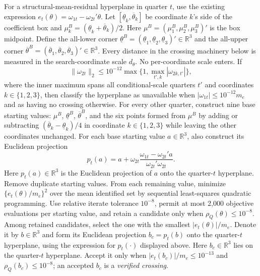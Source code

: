 \documentclass[11pt]{article}
\begin{document}
For a structural-mean-residual hyperplane in quarter \(t\), use the existing expression
\(e_t(\theta)=\omega_{1t}-\omega_{2t}'\theta\). Let \([\underline\theta_k,\overline\theta_k]\) be coordinate
\(k\)'s side of the coefficient box and \(\mu_k^B=(\underline\theta_k+\overline\theta_k)/2\). Here
\(\mu^B=(\mu_1^B,\mu_2^B,\mu_3^B)'\) is the box midpoint. Define the all-lower corner
\(\underline\theta^B=(\underline\theta_1,\underline\theta_2,\underline\theta_3)'\in\mathbb R^3\) and
the all-upper corner
\(\overline\theta^B=(\overline\theta_1,\overline\theta_2,\overline\theta_3)'\in\mathbb R^3\). Every distance in the crossing machinery below is measured in the search-coordinate scale \(d_\theta\). No per-coordinate scale enters.
If
\begin{equation*}
 \|\omega_{2t}\|_2\le10^{-12}\max\{1,\max_{t',k}|\omega_{2k,t'}|\},
\end{equation*}
where the inner maximum spans all conditional-scale quarters \(t'\) and coordinates
\(k\in\{1,2,3\}\),
then classify the hyperplane as unavailable when \(|\omega_{1t}|\le10^{-12}m_e\) and as having no crossing
otherwise. For every other quarter, construct nine base starting values: \(\mu^B\),
\(\underline\theta^B\), \(\overline\theta^B\),
and the six points formed from \(\mu^B\) by adding or subtracting \((\overline\theta_k-\underline\theta_k)/4\) in coordinate
\(k\in\{1,2,3\}\) while leaving the other coordinates unchanged. For each base starting value
\(a\in\mathbb R^3\), also construct its Euclidean projection
\begin{equation*}
 p_t(a)=a+\omega_{2t}\frac{\omega_{1t}-\omega_{2t}'a}{\omega_{2t}'\omega_{2t}}.
\end{equation*}
Here \(p_t(a)\in\mathbb R^3\) is the Euclidean projection of \(a\) onto the quarter-\(t\)
hyperplane.
Remove duplicate starting values. From each remaining value, minimize
\(\{e_t(\theta)/m_e\}^2\) over the mean identified set by sequential least-squares quadratic
programming. Use relative iterate tolerance \(10^{-8}\), permit at most 2,000 objective evaluations
per starting value, and retain a candidate only when \(\rho_Q(\theta)\le10^{-8}\). Among retained candidates,
select the one with the smallest \(|e_t(\theta)|/m_e\). Denote it by \(b\in\mathbb R^3\) and form its
Euclidean projection \(b_c=p_t(b)\) onto the quarter-\(t\) hyperplane, using the expression for
\(p_t(\cdot)\) displayed above.
Here \(b_c\in\mathbb R^3\) lies on the quarter-\(t\) hyperplane. Accept it only when
\(|e_t(b_c)|/m_e\le10^{-13}\) and \(\rho_Q(b_c)\le10^{-8}\); an accepted \(b_c\) is a
\emph{verified crossing}.
\end{document}

